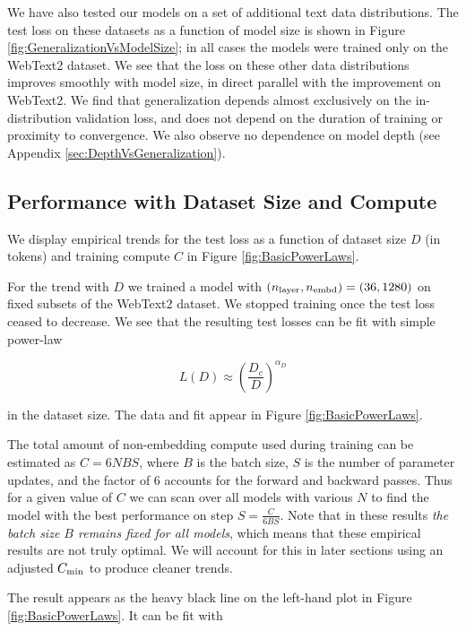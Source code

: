 We have also tested our models on a set of additional text data distributions.  The test loss on these datasets as a function of model size is shown in Figure \ref{fig:GeneralizationVsModelSize}; in all cases the models were trained only on the WebText2 dataset.  We see that the loss on these other data distributions improves smoothly with model size, in direct parallel with the improvement on WebText2.  We find that generalization depends almost exclusively on the in-distribution validation loss, and does not depend on the duration of training or proximity to convergence. We also observe no dependence on model depth (see Appendix \ref{sec:DepthVsGeneralization}).

\subsection{Performance with Dataset Size and Compute}

We display empirical trends for the test loss as a function of dataset size $D$ (in tokens) and training compute $C$ in Figure \ref{fig:BasicPowerLaws}.    

For the trend with $D$ we trained a model with $(n_{\rm layer}, n_{\rm embd}) = (36, 1280)$ on fixed subsets of the WebText2 dataset.  We stopped training once the test loss ceased to decrease.  We see that the resulting test losses can be fit with simple power-law

\begin{equation}
L(D) \approx \left( \frac{D_c}{D} \right)^{\alpha_D}
\end{equation}

in the dataset size.  The data and fit appear in Figure \ref{fig:BasicPowerLaws}.

The total amount of non-embedding compute used during training can be estimated as $C = 6 N B S$, where $B$ is the batch size, $S$ is the number of parameter updates, and the factor of $6$ accounts for the forward and backward passes.  Thus for a given value of $C$ we can scan over all models with various $N$ to find the model with the best performance on step $S = \frac{C}{6 B S}$.  Note that in these results \emph{the batch size $B$ remains fixed for all models}, which means that these empirical results are not truly optimal.  We will account for this in later sections using an adjusted $C_{\rm min}$ to produce cleaner trends.

The result appears as the heavy black line on the left-hand plot in Figure \ref{fig:BasicPowerLaws}.  It can  be fit with

